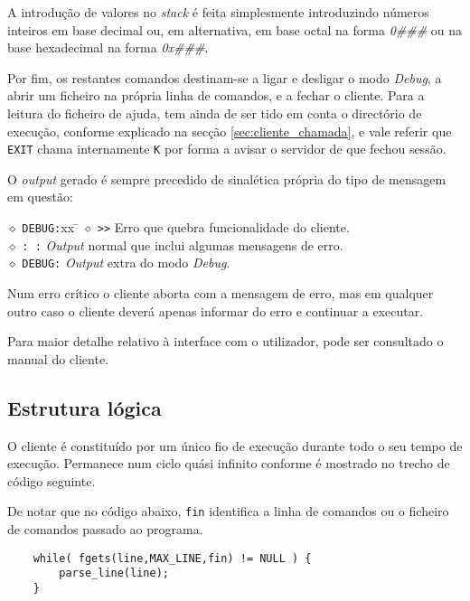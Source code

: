 	A introdução de valores no \emph{stack} é feita simplesmente introduzindo números inteiros em base decimal ou, em alternativa, em base octal na forma \emph{0\#\#\#} ou na base hexadecimal na forma \emph{0x\#\#\#}.
	
	Por fim, os restantes comandos destinam-se a ligar e desligar o modo \emph{Debug}, a abrir um ficheiro na própria linha de comandos, e a fechar o cliente.
	Para a leitura do ficheiro de ajuda, tem ainda de ser tido em conta o directório de execução, conforme explicado na secção \ref{sec:cliente_chamada}, e vale referir que \verb|EXIT| chama internamente \verb|K| por forma a avisar o servidor de que fechou sessão.
	

	O \emph{output} gerado é sempre precedido de sinalética própria do tipo de mensagem em questão:
	
	\begin{tabbing}			%
		$\diamond$ \verb|DEBUG:|xx \= \kill
		$\diamond$ \verb|>>| \> Erro que quebra funcionalidade do cliente.\\
		$\diamond$ \verb|: :| \> \emph{Output} normal que inclui algumas mensagens de erro.\\
		$\diamond$ \verb|DEBUG:| \> \emph{Output} extra do modo \emph{Debug}.
	\end{tabbing}

	Num erro crítico o cliente aborta com a mensagem de erro, mas em qualquer outro caso o cliente deverá apenas informar do erro e continuar a executar.
	
	
	Para maior detalhe relativo à interface com o utilizador, pode ser consultado o manual do cliente.
	
	
\clearpage
\subsection{Estrutura lógica\label{sec:cliente_estrutura}}

	\indent\indent O cliente é constituído por um único fio de execução durante todo o seu tempo de execução.
	Permanece num ciclo quási infinito conforme é mostrado no trecho de código seguinte.
	
	De notar que no código abaixo, \verb|fin| identifica a linha de comandos ou o ficheiro de comandos passado ao programa.
	
	\begin{lstlisting}
	while( fgets(line,MAX_LINE,fin) != NULL ) {
		parse_line(line);
	}
	\end{lstlisting}
	
